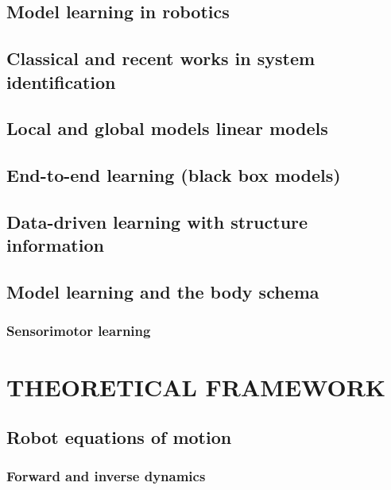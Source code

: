 \documentclass{article}
\begin{document}
\subsection{Model learning in robotics}
\subsection{Classical and recent works in system identification}
\subsection{Local and global models linear models}
\subsection{End-to-end learning (black box models)}
\subsection{Data-driven learning with structure information}
\subsection{Model learning and the body schema}
\subsubsection{Sensorimotor learning}

\section{THEORETICAL FRAMEWORK}
\subsection{Robot equations of motion}
\subsubsection{Forward and inverse dynamics}
\end{document}
